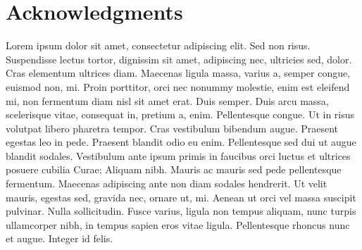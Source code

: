 \chapter*{Acknowledgments}
Lorem ipsum dolor sit amet, consectetur adipiscing elit. Sed non risus.
Suspendisse lectus tortor, dignissim sit amet, adipiscing nec, ultricies sed,
dolor. Cras elementum ultrices diam. Maecenas ligula massa, varius a, semper
congue, euismod non, mi. Proin porttitor, orci nec nonummy molestie, enim est
eleifend mi, non fermentum diam nisl sit amet erat. Duis semper. Duis arcu
massa, scelerisque vitae, consequat in, pretium a, enim. Pellentesque congue. Ut
in risus volutpat libero pharetra tempor. Cras vestibulum bibendum augue.
Praesent egestas leo in pede. Praesent blandit odio eu enim. Pellentesque sed
dui ut augue blandit sodales. Vestibulum ante ipsum primis in faucibus orci
luctus et ultrices posuere cubilia Curae; Aliquam nibh. Mauris ac mauris sed
pede pellentesque fermentum. Maecenas adipiscing ante non diam sodales
hendrerit. Ut velit mauris, egestas sed, gravida nec, ornare ut, mi. Aenean ut
orci vel massa suscipit pulvinar. Nulla sollicitudin. Fusce varius, ligula non
tempus aliquam, nunc turpis ullamcorper nibh, in tempus sapien eros vitae
ligula. Pellentesque rhoncus nunc et augue. Integer id felis.

